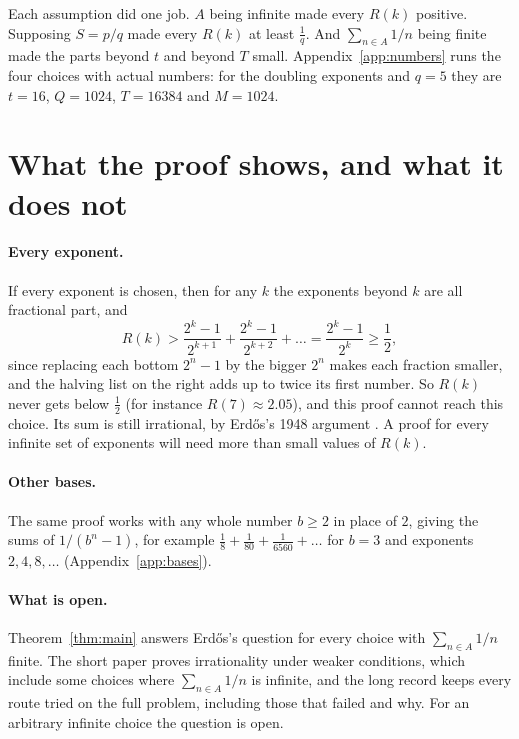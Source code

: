 \documentclass[10pt]{article}
\theoremstyle{plain}
\theoremstyle{definition}
\theoremstyle{remark}
\begin{document}
Each assumption did one job. $A$ being infinite made every $R(k)$
positive. Supposing $S=p/q$ made every $R(k)$ at least $\tfrac1q$. And
$\sum_{n\in A}1/n$ being finite made the parts beyond $t$ and beyond $T$
small. Appendix~\ref{app:numbers} runs the four choices with actual numbers:
for the doubling exponents and $q=5$ they are $t=16$, $Q=1024$, $T=16384$ and
$M=1024$.

\section{What the proof shows, and what it does not}\label{sec:limits}

\paragraph{Every exponent.} If every exponent is chosen, then for any $k$ the
exponents beyond $k$ are all fractional part, and
\[
 R(k)>\frac{2^k-1}{2^{k+1}}+\frac{2^k-1}{2^{k+2}}+\dots=\frac{2^k-1}{2^k}\ge\frac12 ,
\]
since replacing each bottom $2^n-1$ by the bigger $2^n$ makes each fraction
smaller, and the halving list on the right adds up to twice its first number.
So $R(k)$ never gets below $\tfrac12$ (for instance
$R(7)\approx2.05$), and this proof cannot reach this choice. Its sum is still
irrational, by Erd\H{o}s's 1948 argument \cite{erdos1948}. A proof for every
infinite set of exponents will need more than small values of $R(k)$.

\paragraph{Other bases.} The same proof works with any whole number $b\ge2$ in
place of $2$, giving the sums of $1/(b^n-1)$, for example
$\tfrac18+\tfrac1{80}+\tfrac1{6560}+\dots$ for $b=3$ and exponents
$2,4,8,\dots$ (Appendix~\ref{app:bases}).

\paragraph{What is open.} Theorem~\ref{thm:main} answers Erd\H{o}s's question
for every choice with $\sum_{n\in A}1/n$ finite. The short paper
\cite{shortpaper} proves irrationality under weaker conditions, which include
some choices where $\sum_{n\in A}1/n$ is infinite, and the long record
\cite{longrecord} keeps every route tried on the full problem, including those
that failed and why. For an arbitrary infinite choice the question is open.
\end{document}
